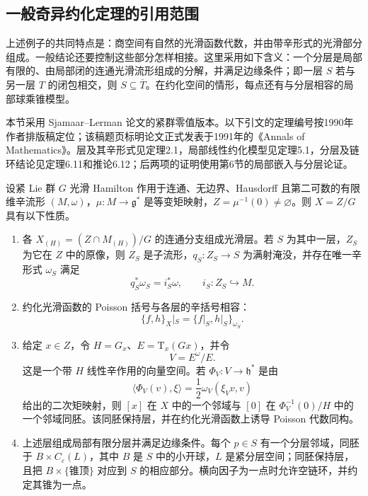\subsection{一般奇异约化定理的引用范围}
\label{g4:subsec:1004:04}
上述例子的共同特点是：商空间有自然的光滑函数代数，并由带辛形式的光滑部分组成。一般结论还要控制这些部分怎样相接。这里采用如下含义：一个分层是局部有限的、由局部闭的连通光滑流形组成的分解，并满足边缘条件；即一层 \(S\) 若与另一层 \(T\) 的闭包相交，则 \(S\subseteq\overline T\)。在约化空间的情形，每点还有与分层相容的局部球乘锥模型。

\ProseParagraphBreak

本节采用 Sjamaar--Lerman 论文的紧群零值版本。以下引文的定理编号按1990年作者排版稿定位；该稿题页标明论文正式发表于1991年的《Annals of Mathematics》。层及其辛形式见定理2.1，局部线性约化模型见定理5.1，分层及链环结论见定理6.11和推论6.12；后两项的证明使用第6节的局部嵌入与分层论证。\cite[1990年作者稿，定理2.1、5.1、6.11及推论6.12]{SjamaarLerman1991Reduction}

\begin{theorem}\label{g4:thm:1004:singular-reduction}
	设紧 Lie 群 \(G\) 光滑 Hamilton 作用于连通、无边界、Hausdorff 且第二可数的有限维辛流形 \((M,\omega)\)，\(\mu:M\to\mathfrak g^*\) 是等变矩映射，\(Z=\mu^{-1}(0)\neq\varnothing\)。则 \(X=Z/G\) 具有以下性质。
	\begin{enumerate}
		\item 各 \(X_{(H)}=(Z\cap M_{(H)})/G\) 的连通分支组成光滑层。若 \(S\) 为其中一层，\(Z_S\) 为它在 \(Z\) 中的原像，则 \(Z_S\) 是子流形，\(q_S:Z_S\to S\) 为满射淹没，并存在唯一辛形式 \(\omega_S\) 满足
		\[
			q_S^*\omega_S=i_S^*\omega,
			\qquad i_S:Z_S\hookrightarrow M.
		\]
		\item 约化光滑函数的 Poisson 括号与各层的辛括号相容：
		\[
			\{f,h\}_X|_S=\{f|_S,h|_S\}_{\omega_S}.
		\]
		\item 给定 \(x\in Z\)，令 \(H=G_x\)、\(E=\mathrm{T}_x(Gx)\)，并令
		\[
			V=E^\omega/E.
		\]
		这是一个带 \(H\) 线性辛作用的向量空间。若 \(\Phi_V:V\to\mathfrak h^*\) 是由
		\[
			\langle\Phi_V(v),\xi\rangle
			=\frac12\omega_V(\xi_Vv,v)
		\]
		给出的二次矩映射，则 \([x]\) 在 \(X\) 中的一个邻域与 \([0]\) 在 \(\Phi_V^{-1}(0)/H\) 中的一个邻域同胚。该同胚保持层，并在约化光滑函数上诱导 Poisson 代数同构。
		\item 上述层组成局部有限分层并满足边缘条件。每个 \(p\in S\) 有一个分层邻域，同胚于 \(B\times C_{\varepsilon}(L)\)，其中 \(B\) 是 \(S\) 中的小开球，\(L\) 是紧分层空间；同胚保持层，且把 \(B\times\{\text{锥顶}\}\) 对应到 \(S\) 的相应部分。横向因子为一点时允许空链环，并约定其锥为一点。
	\end{enumerate}
\end{theorem}


